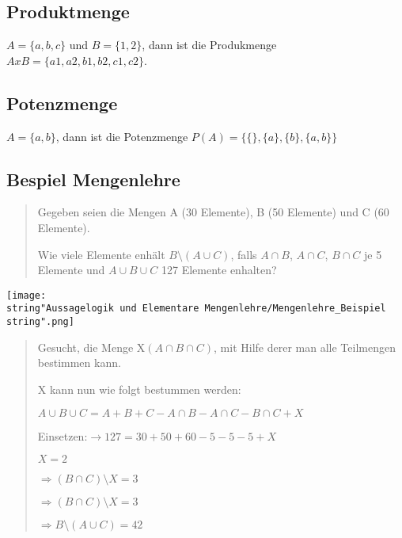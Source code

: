\subsection*{Produktmenge}

$A=\{a,b,c\}$ und $B=\{1,2\}$, dann ist die Produkmenge $AxB=\{a1,a2,b1,b2,c1,c2\}$.


\subsection*{Potenzmenge}

$A=\{a,b\}$, dann ist die Potenzmenge $P(A)=\{\{\},\{a\},\{b\},\{a,b\}\}$


\subsection*{Bespiel Mengenlehre}
\begin{quote}
Gegeben seien die Mengen A (30 Elemente), B (50 Elemente) und C (60
Elemente).

Wie viele Elemente enhält $B\setminus(A\cup C)$, falls $A\cap B$,
$A\cap C$, $B\cap C$ je 5 Elemente und $A\cup B\cup C$ 127 Elemente
enhalten?
\end{quote}
\begin{center}
\texttt{[image: \\string"Aussagelogik und Elementare Mengenlehre/Mengenlehre\_Beispiel\\string".png]}
\par\end{center}
\begin{quote}
Gesucht, die Menge X$(A\cap B\cap C)$, mit Hilfe derer man alle Teilmengen
bestimmen kann.

X kann nun wie folgt bestummen werden:

$A\cup B\cup C=A+B+C-A\cap B-A\cap C-B\cap C+X$

Einsetzen:$\rightarrow127=30+50+60-5-5-5+X$

$X=2$ 

$\Rightarrow(B\cap C)\setminus X=3$

$\Rightarrow(B\cap C)\setminus X=3$

$\Rightarrow B\setminus(A\cup C)=42$\end{quote}

